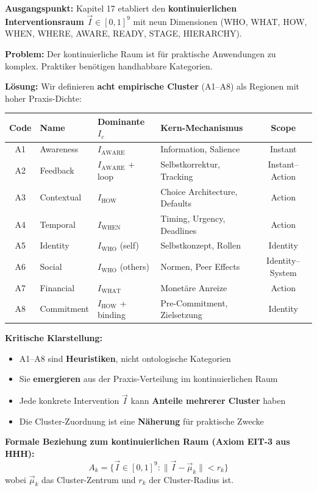 \begin{tcolorbox}[colback=blue!10!white, colframe=blue!75!black,
    title=\textbf{Die Acht Heuristischen Cluster (A1--A8): Formale Definition}]

\textbf{Ausgangspunkt:} Kapitel 17 etabliert den \textbf{kontinuierlichen Interventionsraum} $\vec{I} \in [0,1]^9$ mit neun Dimensionen (WHO, WHAT, HOW, WHEN, WHERE, AWARE, READY, STAGE, HIERARCHY).

\textbf{Problem:} Der kontinuierliche Raum ist für praktische Anwendungen zu komplex. Praktiker benötigen handhabbare Kategorien.

\textbf{Lösung:} Wir definieren \textbf{acht empirische Cluster} (A1--A8) als Regionen mit hoher Praxis-Dichte:

\begin{center}
\renewcommand{\arraystretch}{1.3}
\footnotesize
\begin{tabular}{@{}clllc@{}}
\toprule
\textbf{Code} & \textbf{Name} & \textbf{Dominante $I_c$} & \textbf{Kern-Mechanismus} & \textbf{Scope} \\
\midrule
A1 & Awareness & $I_{\text{AWARE}}$ & Information, Salience & Instant \\
A2 & Feedback & $I_{\text{AWARE}}$ + loop & Selbstkorrektur, Tracking & Instant--Action \\
A3 & Contextual & $I_{\text{HOW}}$ & Choice Architecture, Defaults & Action \\
A4 & Temporal & $I_{\text{WHEN}}$ & Timing, Urgency, Deadlines & Action \\
A5 & Identity & $I_{\text{WHO}}$ (self) & Selbstkonzept, Rollen & Identity \\
A6 & Social & $I_{\text{WHO}}$ (others) & Normen, Peer Effects & Identity--System \\
A7 & Financial & $I_{\text{WHAT}}$ & Monetäre Anreize & Action \\
A8 & Commitment & $I_{\text{HOW}}$ + binding & Pre-Commitment, Zielsetzung & Identity \\
\bottomrule
\end{tabular}
\end{center}

\textbf{Kritische Klarstellung:}
\begin{itemize}[nosep]
\item A1--A8 sind \textbf{Heuristiken}, nicht ontologische Kategorien
\item Sie \textbf{emergieren} aus der Praxis-Verteilung im kontinuierlichen Raum
\item Jede konkrete Intervention $\vec{I}$ kann \textbf{Anteile mehrerer Cluster} haben
\item Die Cluster-Zuordnung ist eine \textbf{Näherung} für praktische Zwecke
\end{itemize}

\textbf{Formale Beziehung zum kontinuierlichen Raum (Axiom EIT-3 aus HHH):}
\begin{equation}
\boxed{A_k = \{\vec{I} \in [0,1]^9 : \|\vec{I} - \vec{\mu}_k\| < r_k\}}
\end{equation}
wobei $\vec{\mu}_k$ das Cluster-Zentrum und $r_k$ der Cluster-Radius ist.

\end{tcolorbox}

